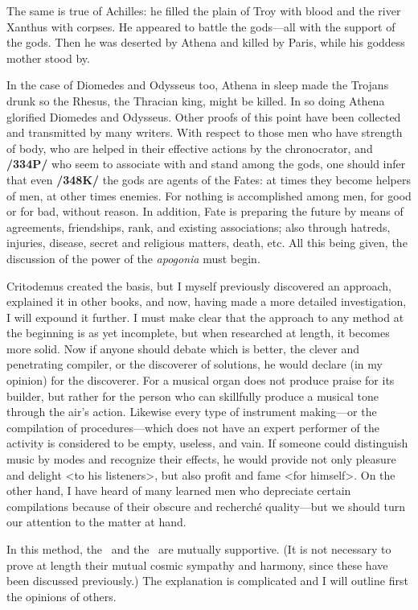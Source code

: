 The same is true of Achilles: he filled the plain of Troy with blood and the river Xanthus with corpses. He appeared to battle the gods—all with the support of the gods. Then he was deserted by Athena and killed by Paris, while his goddess mother stood by. 

In the case of Diomedes and Odysseus too, Athena in sleep made the Trojans drunk so the Rhesus, the Thracian king, might be killed. In so doing Athena glorified Diomedes and Odysseus. Other proofs of this point have been collected and transmitted by many writers. With respect to those men who have strength of body, who are helped in their effective actions by the chronocrator, and \textbf{/334P/} who seem to associate with and stand among the gods, one should infer that even \textbf{/348K/} the gods are agents of the Fates: at times they become helpers of men, at other times enemies. For nothing is accomplished among men, for good or for bad, without reason. In addition, Fate is preparing the future by means of agreements, friendships, rank, and existing associations; also through hatreds, injuries, disease, secret and religious matters, death, etc. All this being given, the discussion of the power of the \textit{apogonia} must begin. 

Critodemus created the basis, but I myself previously discovered an approach, explained it in other books, and now, having made a more detailed investigation, I will expound it further. I must make clear that the approach to any method at the beginning is as yet incomplete, but when researched at length, it becomes more solid. Now if anyone should debate which is better, the clever and penetrating compiler, or the discoverer of solutions, he would declare (in my opinion) for the discoverer. For a musical organ does not produce praise for its builder, but rather for the person who can skillfully produce a musical tone through the air’s action. Likewise every type of instrument making—or the compilation of procedures—which does not have an expert performer of the activity is considered to be empty, useless, and vain. If someone could distinguish music by modes and recognize their effects, he would provide not only pleasure and delight <to his listeners>, but also profit and fame <for himself>. On the other hand, I have heard of many learned men who depreciate certain compilations because of their obscure and recherché quality—but we should turn our attention to the matter at hand.

In this method, the \Sun\, and the \Moon\, are mutually supportive. (It is not necessary to prove at length their mutual cosmic sympathy and harmony, since these have been discussed previously.) The explanation
is complicated and I will outline first the opinions of others. 

